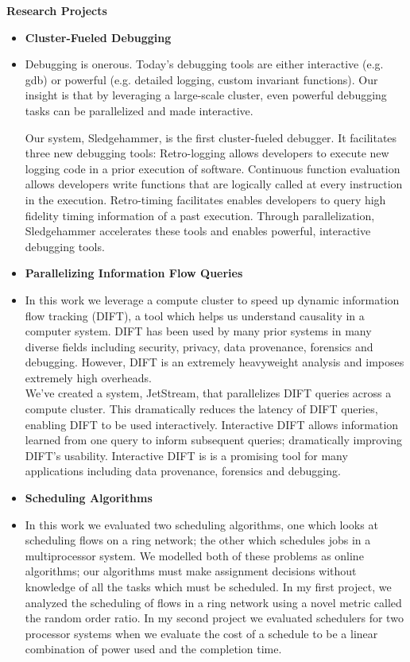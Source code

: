 \documentclass[letterpaper,11pt]{article}
\newcommand{\resheading}[1]{{\large \colorbox{mygrey}{\begin{minipage}{\textwidth}{\textbf{#1\vphantom{p\^{E}}}}\end{minipage}}}}
\newcommand{\tab}{\hspace*{1em}}
\newcommand{\heading}[4]{
\vspace{#1}
\begin{minipage}{8cm}
\flushleft
\textbf{#2}
\end{minipage}
\null\hfill
\begin{minipage}{7cm}
\flushright 
\textbf{#3}
\end{minipage}
\vspace{#4}
}
\begin{document}
\resheading{Research Projects}
\begin{itemize}
\item[] \heading{0em}{Cluster-Fueled Debugging}{}{.25em}
\item[] Debugging is onerous.  Today's debugging tools are either
  interactive (e.g. gdb) or powerful (e.g. detailed logging, custom
  invariant functions).  Our insight is that by leveraging a
  large-scale cluster, even powerful debugging tasks can be
  parallelized and made interactive.

  \tab Our system, Sledgehammer, is the first cluster-fueled debugger.
  It facilitates three new debugging tools: Retro-logging allows
  developers to execute new logging code in a prior execution of
  software.  Continuous function evaluation allows developers write
  functions that are logically called at every instruction in the
  execution.  Retro-timing facilitates enables developers to query
  high fidelity timing information of a past execution.  Through
  parallelization, Sledgehammer accelerates these tools and enables
  powerful, interactive debugging tools.

\item[] \heading{0em}{Parallelizing Information Flow Queries}{}{.25em}
\item[] In this work we leverage a compute cluster to speed up dynamic
  information flow tracking (DIFT), a tool which helps us understand
  causality in a computer system. DIFT has been used by many prior
  systems in many diverse fields including security, privacy, data
  provenance, forensics and debugging.  However, DIFT is an extremely
  heavyweight analysis and imposes extremely high overheads.\\

  \tab We've created a system, JetStream, that parallelizes DIFT
  queries across a compute cluster.  This dramatically reduces the
  latency of DIFT queries, enabling DIFT to be used interactively.
  Interactive DIFT allows information learned from one query to inform
  subsequent queries; dramatically improving DIFT's usability.
  Interactive DIFT is is a promising tool for many applications
  including data provenance, forensics and debugging.

\item[] \heading{0em}{Scheduling Algorithms}{}{.25em}
\item[] In this work we evaluated two scheduling algorithms, one which
  looks at scheduling flows on a ring network; the other which
  schedules jobs in a multiprocessor system. We modelled both of these
  problems as online algorithms; our algorithms must make assignment
  decisions without knowledge of all the tasks which must be
  scheduled. In my first project, we analyzed the scheduling of flows
  in a ring network using a novel metric called the random order
  ratio. In my second project we evaluated schedulers for two
  processor systems when we evaluate the cost of a schedule to be a
  linear combination of power used and the completion time.


\end{itemize}
\end{document}
